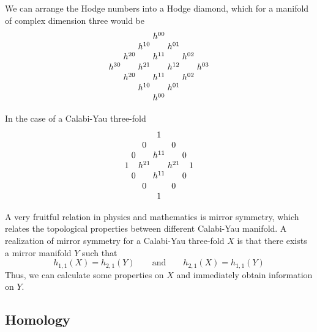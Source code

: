We can arrange the Hodge numbers into a Hodge diamond, which for a manifold of complex dimension
three would be
{\small \[
\arraycolsep=1.5pt
\begin{array}{ccccccc}
  &&&h^{00}&&&\\
 &&h^{10}&&h^{01}&&\\
 &h^{20}&&h^{11}&&h^{02}&\\
 h^{30}&&h^{21}&&h^{12}&&h^{03}\\
 &h^{20}&&h^{11}&&h^{02}&\\
 &&h^{10}&&h^{01}&&\\
  &&&h^{00}&&&
\end{array}
\]}

In the case of a Calabi-Yau three-fold
{\small \[
\arraycolsep=1.5pt
\begin{array}{ccccccc}
  &&&1&&&\\
 &&0&&0&&\\
 &0&&h^{11}&&0&\\
 1&&h^{21}&&h^{21}&&1\\
 &0&&h^{11}&&0&\\
 &&0&&0&&\\
  &&&1&&&
\end{array}
\]}

A very fruitful relation in physics and mathematics is mirror symmetry, which relates the topological
properties between different Calabi-Yau manifold.
A realization of mirror symmetry for a Calabi-Yau three-fold $X$ is that there exists a mirror manifold $Y$
such that
\begin{equation}
  h_{1,1}(X)=h_{2,1}(Y) \qquad \mathrm{and} \qquad h_{2,1}(X)=h_{1,1}(Y)
\end{equation}
Thus, we can calculate some properties on $X$ and immediately obtain information on $Y$.

\subsection{Homology}


